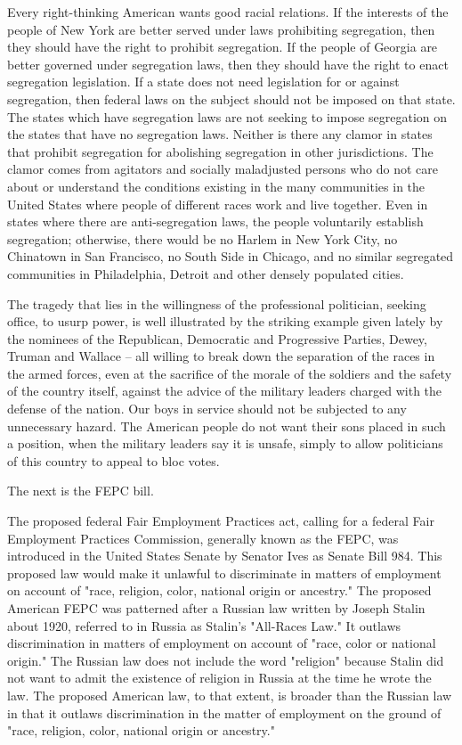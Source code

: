 \documentclass[10pt,a4paper]{article}
\begin{document}
Every right-thinking American wants good racial relations. If the interests of the people of New York are better served under laws prohibiting segregation, then they should have the right to prohibit segregation. If the people of Georgia are better governed under segregation laws, then they should have the right to enact segregation legislation. If a state does not need legislation for or against segregation, then federal laws on the subject should not be imposed on that state. The states which have segregation laws are not seeking to impose segregation on the states that have no segregation laws. Neither is there any clamor in states that prohibit segregation for abolishing segregation in other jurisdictions. The clamor comes from agitators and socially maladjusted persons who do not care about or understand the conditions existing in the many communities in the United States where people of different races work and live together. Even in states where there are anti-segregation laws, the people voluntarily establish segregation; otherwise, there would be no Harlem in New York City, no Chinatown in San Francisco, no South Side in Chicago, and no similar segregated communities in Philadelphia, Detroit and other densely populated cities.

The tragedy that lies in the willingness of the professional politician, seeking office, to usurp power, is well illustrated by the striking example given lately by the nominees of the Republican, Democratic and Progressive Parties, Dewey, Truman and Wallace -- all willing to break down the separation of the races in the armed forces, even at the sacrifice of the morale of the soldiers and the safety of the country itself, against the advice of the military leaders charged with the defense of the nation. Our boys in service should not be subjected to any unnecessary hazard. The American people do not want their sons placed in such a position, when the military leaders say it is unsafe, simply to allow politicians of this country to appeal to bloc votes.

The next is the FEPC bill.

The proposed federal Fair Employment Practices act, calling for a federal Fair Employment Practices Commission, generally known as the FEPC, was introduced in the United States Senate by Senator Ives as Senate Bill 984. This proposed law would make it unlawful to discriminate in matters of employment on account of "race, religion, color, national origin or ancestry." The proposed American FEPC was patterned after a Russian law written by Joseph Stalin about 1920, referred to in Russia as Stalin's "All-Races Law." It outlaws discrimination in matters of employment on account of "race, color or national origin." The Russian law does not include the word "religion" because Stalin did not want to admit the existence of religion in Russia at the time he wrote the law. The proposed American law, to that extent, is broader than the Russian law in that it outlaws discrimination in the matter of employment on the ground of "race, religion, color, national origin or ancestry."
\end{document}
